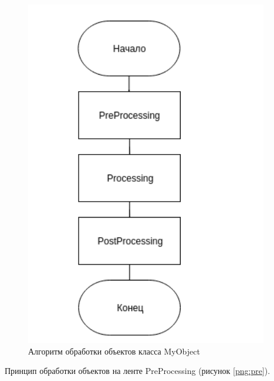         \begin{figure}[h!]
            \centering
            \includegraphics[scale=0.6]{obj.png}
 \caption{Алгоритм обработки объектов класса MyObject}
            \label{png:obj}
        \end{figure} 

Принцип обработки объектов на ленте PreProcessing (рисунок \ref{png:pre}).

